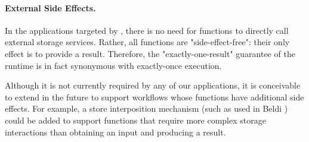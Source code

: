 \paragraph{External Side Effects.} In the applications targeted by \name{},
there is no need for functions to directly call external storage services.
Rather, all functions are "side-effect-free": their only effect is to provide
a result. Therefore, the "exactly-one-result" guarantee of the \name{} runtime
is in fact synonymous with exactly-once execution.

Although it is not currently required by any of our applications, it is
conceivable to extend \name{} in the future to support workflows whose
functions have additional side effects. For example, a store interposition
mechanism (such as used in Beldi \cite{beldi}) could be added to support
functions that require more complex storage interactions than obtaining an
input and producing a result.